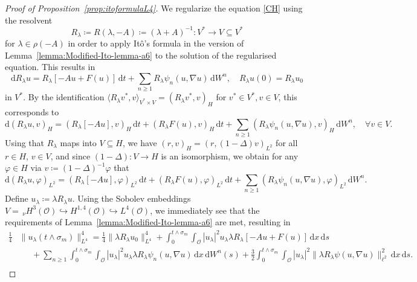 \documentclass[reqno]{amsart}
\newcommand{\sO}{\mathscr{O}}
\newcommand{\ce}{\coloneqq}
\newcommand{\ec}{\eqqcolon}
\newcommand{\seq}{\subseteq}
\newcommand{\hra}{\hookrightarrow}
\newcommand{\1}{\mathbf{1}}
\newcommand{\grad}{\nabla}
\newcommand{\rmd}{\mathrm{d}}
\newcommand{\dt}{\,\mathrm{d}t}
\newcommand{\ds}{\,\mathrm{d}s}
\newcommand{\dx}{\,\mathrm{d}x}
\newcommand{\dWsn}{\,\mathrm{d}W^n(s)}
\newcommand{\inttm}{\int_0^{t\wedge\sigma_m}}
\newcommand{\nH}{\ensuremath{\,_\nu H}}
\begin{document}
\begin{proof}[Proof of Proposition~\ref{prop:itoformulaL4}]
    We regularize the equation \eqref{CH} using the resolvent
    \begin{equation*}
        R_{\lambda} \ce R(\lambda, -A)\ce (\lambda + A)^{-1}\colon V^\ast \to V \seq V^\ast
    \end{equation*}
    for $\lambda \in \rho(-A)$ in order to apply Itô's formula in the version of Lemma~\ref{lemma:Modified-Ito-lemma-a6} to the solution of the regularised equation. 
    This results in
    \begin{equation*}
        \rmd R_\lambda u = R_\lambda[-Au+F(u)]\dt + \sum_{n \geq 1} R_\lambda \psi_n(u,\grad u)\,\rmd W^n,\quad R_\lambda u(0)= R_\lambda u_0
    \end{equation*}
    in $V^\ast$. By the identification $\langle R_\lambda v^*, v\rangle_{V^\ast \times  V} = (R_\lambda v^*, v)_{H}$ for $v^\ast\in V^\ast, v\in V$, this corresponds to
    \begin{equation*}
        \rmd (R_\lambda u, v)_H  =  (R_\lambda[-Au], v)_H  \dt + (R_\lambda F(u), v)_H \dt + \sum_{n \geq 1} (R_\lambda \psi_n(u,\grad u), v)_H \,\rmd W^n,\quad \forall v\in V.
    \end{equation*}
    Using that $R_\lambda$ maps into $V \seq H$, we have $(r, v)_H = (r, (1-\Delta) v)_{L^2}$ for all $r\in H$, $v\in V$, and since $(1-\Delta):V \to H$ is an isomorphism, we obtain for any $\varphi \in H$ via $v\ce (1-\Delta)^{-1}\varphi$ that
    \begin{equation*}
        \rmd (R_\lambda u, \varphi)_{L^2} =  (R_\lambda[-Au], \varphi)_{L^2}\dt     + (R_\lambda F(u), \varphi)_{L^2} \dt + \sum_{n \geq 1} (R_\lambda \psi_n(u,\grad u), \varphi)_{L^2} \,\rmd W^n.
    \end{equation*}
    Define $u_\lambda \ce \lambda R_\lambda u$. Using the Sobolev embeddings $V = \nH^3(\sO) \hookrightarrow H^{1,4}(\sO) \hra L^4(\sO)$, we immediately see that the requirements of Lemma~\ref{lemma:Modified-Ito-lemma-a6} are met,
    resulting in
    \begin{align}
    \label{eq:ItoFormulaLambda}
      \frac{1}{4}&\|u_\lambda(t\wedge\sigma_m)\|_{L^4}^4 =  \frac{1}{4}\|\lambda R_\lambda u_0\|_{L^4}^4 +  \inttm\int_{\sO} |u_\lambda|^2 u_\lambda
    \lambda R_\lambda[-Au+ F(u)]\dx\ds\nonumber\\
      &\phantom{\ec }+ \sum_{n \geq 1} \inttm \int_{\sO}|u_\lambda|^2 u_\lambda 
      \lambda R_\lambda \psi_n(u,\grad u) \dx \dWsn  + \frac{3}{2} \inttm\int_{\sO} |u_\lambda|^2 \|\lambda R_\lambda \psi(u,\grad u)\|_{\ell^2}^2 \dx \ds.\nonumber \\

\end{align}
\end{proof}
\end{document}
